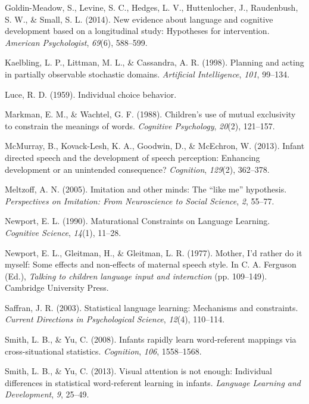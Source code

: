 \documentclass[10pt, letterpaper]{article}
\begin{document}
\hypertarget{ref-goldin-meadow2014}{}
Goldin-Meadow, S., Levine, S. C., Hedges, L. V., Huttenlocher, J.,
Raudenbush, S. W., \& Small, S. L. (2014). New evidence about language
and cognitive development based on a longitudinal study: Hypotheses for
intervention. \emph{American Psychologist}, \emph{69}(6), 588--599.

\hypertarget{ref-kaelbling1998}{}
Kaelbling, L. P., Littman, M. L., \& Cassandra, A. R. (1998). Planning
and acting in partially observable stochastic domains. \emph{Artificial
Intelligence}, \emph{101}, 99--134.

\hypertarget{ref-luce1959}{}
Luce, R. D. (1959). Individual choice behavior.

\hypertarget{ref-markman1988}{}
Markman, E. M., \& Wachtel, G. F. (1988). Children's use of mutual
exclusivity to constrain the meanings of words. \emph{Cognitive
Psychology}, \emph{20}(2), 121--157.

\hypertarget{ref-mcmurray2013}{}
McMurray, B., Kovack-Lesh, K. A., Goodwin, D., \& McEchron, W. (2013).
Infant directed speech and the development of speech perception:
Enhancing development or an unintended consequence? \emph{Cognition},
\emph{129}(2), 362--378.

\hypertarget{ref-meltzoff2005}{}
Meltzoff, A. N. (2005). Imitation and other minds: The ``like me''
hypothesis. \emph{Perspectives on Imitation: From Neuroscience to Social
Science}, \emph{2}, 55--77.

\hypertarget{ref-newport1990}{}
Newport, E. L. (1990). Maturational Constraints on Language Learning.
\emph{Cognitive Science}, \emph{14}(1), 11--28.

\hypertarget{ref-newport1977}{}
Newport, E. L., Gleitman, H., \& Gleitman, L. R. (1977). Mother, I'd
rather do it myself: Some effects and non-effects of maternal speech
style. In C. A. Ferguson (Ed.), \emph{Talking to children language input
and interaction} (pp. 109--149). Cambridge University Press.

\hypertarget{ref-saffran2003}{}
Saffran, J. R. (2003). Statistical language learning: Mechanisms and
constraints. \emph{Current Directions in Psychological Science},
\emph{12}(4), 110--114.

\hypertarget{ref-smith2008}{}
Smith, L. B., \& Yu, C. (2008). Infants rapidly learn word-referent
mappings via cross-situational statistics. \emph{Cognition}, \emph{106},
1558--1568.

\hypertarget{ref-smith2013}{}
Smith, L. B., \& Yu, C. (2013). Visual attention is not enough:
Individual differences in statistical word-referent learning in infants.
\emph{Language Learning and Development}, \emph{9}, 25--49.
\end{document}

